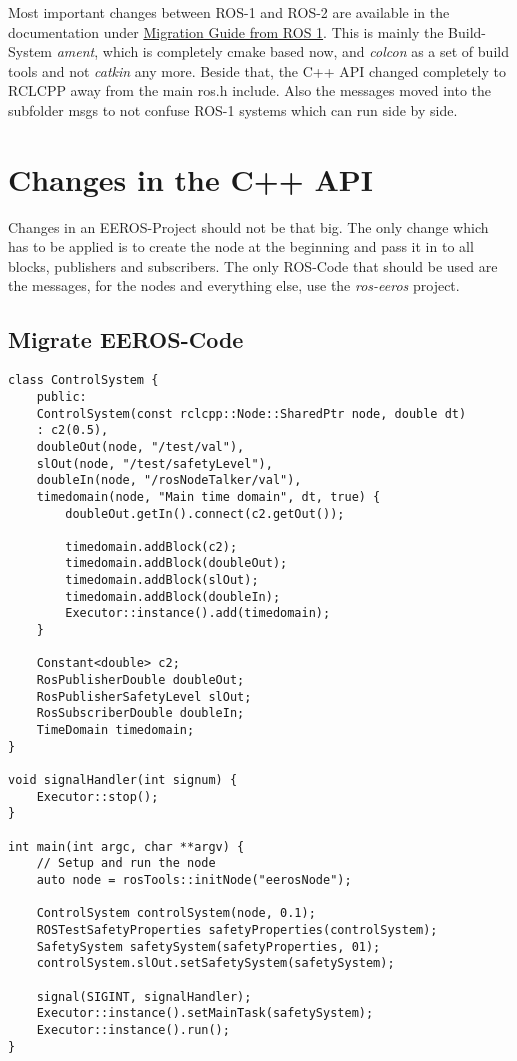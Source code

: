 
Most important changes between ROS-1 and ROS-2 are available in the documentation under \href{http://docs.ros.org/en/humble/The-ROS2-Project/Contributing/Migration-Guide.html}{Migration Guide from ROS 1}.
This is mainly the Build-System \textit{ament}, which is completely cmake based now, and \textit{colcon} as a set of build tools and not \textit{catkin} any more.
Beside that, the C++ API changed completely to RCLCPP away from the main ros.h include.
Also the messages moved into the subfolder msgs to not confuse ROS-1 systems which can run side by side.


\section[C++ API]{Changes in the C++ API} \label{sec:cpp-api-changes}

Changes in an EEROS-Project should not be that big. The only change which has to be applied is to create the node at the beginning and pass it in to all blocks, publishers and subscribers.
The only ROS-Code that should be used are the messages, for the nodes and everything else, use the \textit{ros-eeros} project.


\subsection[EEOR-Migration]{Migrate EEROS-Code} \label{sec:cpp-eeros-migration}

\lstset{language=[ISO]C++}
\begin{lstlisting}[label=code:cpp-eeros-migration, caption={[EEROS-Migration]The main changes are in the initialization and the passthrough of the node as a shared pointer. Check \textit{rosTest1} Example for complete code example.}]
class ControlSystem {
    public:
    ControlSystem(const rclcpp::Node::SharedPtr node, double dt)
    : c2(0.5),
    doubleOut(node, "/test/val"),
    slOut(node, "/test/safetyLevel"),
    doubleIn(node, "/rosNodeTalker/val"),
    timedomain(node, "Main time domain", dt, true) {
        doubleOut.getIn().connect(c2.getOut());

        timedomain.addBlock(c2);
        timedomain.addBlock(doubleOut);
        timedomain.addBlock(slOut);
        timedomain.addBlock(doubleIn);
        Executor::instance().add(timedomain);
    }

    Constant<double> c2;
    RosPublisherDouble doubleOut;
    RosPublisherSafetyLevel slOut;
    RosSubscriberDouble doubleIn;
    TimeDomain timedomain;
}

void signalHandler(int signum) {
    Executor::stop();
}

int main(int argc, char **argv) {
    // Setup and run the node
    auto node = rosTools::initNode("eerosNode");

    ControlSystem controlSystem(node, 0.1);
    ROSTestSafetyProperties safetyProperties(controlSystem);
    SafetySystem safetySystem(safetyProperties, 01);
    controlSystem.slOut.setSafetySystem(safetySystem);

    signal(SIGINT, signalHandler);
    Executor::instance().setMainTask(safetySystem);
    Executor::instance().run();
}
\end{lstlisting}




